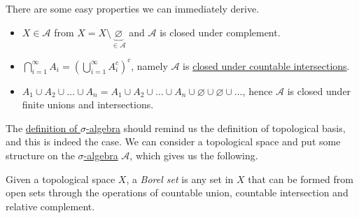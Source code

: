 \begin{remark}
	There are some easy properties we can immediately derive.
	\begin{itemize}
		\item \(X\in \mathcal{A} \) from \(X = X\setminus \underbrace{\varnothing}_{\in \mathcal{A}} \) and \(\mathcal{A}\) is closed under complement.
		\item \(\bigcap\limits_{i=1}^{\infty} A_{i} = \left(\bigcup\limits_{i=1}^{\infty} A_{i}^{c} \right)^c\), namely \(\mathcal{A} \) is \underline{closed under countable intersections}.
		\item \(A_1\cup A_2 \cup \ldots \cup A_n = A_1\cup A_2 \cup \ldots \cup A_n \cup \varnothing \cup \varnothing \cup\ldots\), hence \(\mathcal{A} \) is closed under finite unions and intersections.
	\end{itemize}
\end{remark}

\begin{note}
	The \hyperref[def:sigma-algebra]{definition of \(\sigma\)-algebra} should remind us the definition of topological basis, and this is indeed the case.
	We can consider a topological space and put some structure on the \hyperref[def:sigma-algebra]{\(\sigma\)-algebra} \(\mathcal{A} \),
	which gives us the following.
\end{note}

\begin{definition}\label{def:Borel-set}
	Given a topological space \(X\), a \emph{Borel set} is any set in \(X\) that can be formed from open sets through the operations of countable union, countable intersection and relative complement.
\end{definition}